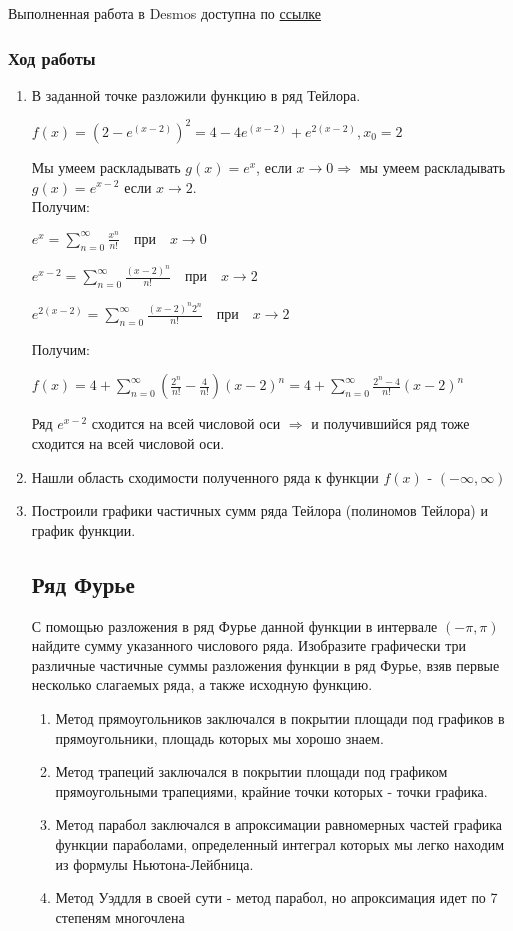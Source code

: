\documentclass{article}
\begin{document}
Выполненная работа в Desmos доступна по 
\href{https://www.desmos.com/calculator/0sct6ckztm}{ссылке}

\subsubsection*{Ход работы}

\begin{enumerate}
    \item В заданной точке разложили  функцию в ряд Тейлора.
	
    $f(x) = (2 - e^{(x-2)})^2 = 4 - 4e^{(x-2)} + e^{2(x-2)}, x_0 = 2$

    Мы умеем раскладывать $g(x) = e^{x}$, если $x\to0 \Rightarrow$ мы умеем раскладывать $g(x) = e^{x-2}$ если $x \to 2$.\\

    Получим:

    $e^{x} =\sum_{n=0}^{\infty} \frac{x^n}{n!} \quad \text{при} \quad x \to 0$

    $e^{x-2} =        \sum_{n=0}^{\infty} \frac{(x-2)^n}{n!} \quad \text{при} \quad x \to 2$

    $e^{2(x-2)} =        \sum_{n=0}^{\infty} \frac{(x-2)^n2^{n}}{n!} \quad \text{при} \quad x \to 2$

    Получим:

    $f(x) = 4 + \sum_{n=0}^{\infty}(\frac{2^{n}}{n!} - \frac{4}{n!})(x-2)^{n} = 4 + \sum_{n=0}^{\infty}\frac{2^{n}-4}{n!}(x-2)^{n}$
    
    Ряд $e^{x-2}$ сходится на всей числовой оси $\Rightarrow$ и получившийся ряд тоже сходится на всей числовой оси.

    \item Нашли область сходимости полученного ряда к функции $f(x)$ - $(-\infty, \infty)$
    \item Построили графики частичных сумм ряда Тейлора (полиномов Тейлора) и график функции.

\subsection{Ряд Фурье}
С помощью разложения в ряд Фурье данной функции в интервале $(-\pi, \pi)$ найдите сумму указанного числового ряда. Изобразите графически три различные частичные суммы разложения функции в ряд Фурье, взяв первые несколько слагаемых ряда, а также исходную функцию.

\begin{enumerate}
    \item Метод прямоугольников заключался в покрытии площади под графиков в прямоугольники, площадь которых мы хорошо знаем.
    \item Метод трапеций заключался в покрытии площади под графиком прямоугольными трапециями, крайние точки которых - точки графика.
    \item Метод парабол заключался в апроксимации равномерных частей графика функции параболами, определенный интеграл которых мы легко находим из формулы Ньютона-Лейбница. 
    \item Метод Уэддля в своей сути - метод парабол, но апроксимация идет по 7 степеням многочлена
\end{enumerate}


\end{enumerate}
\end{document}

